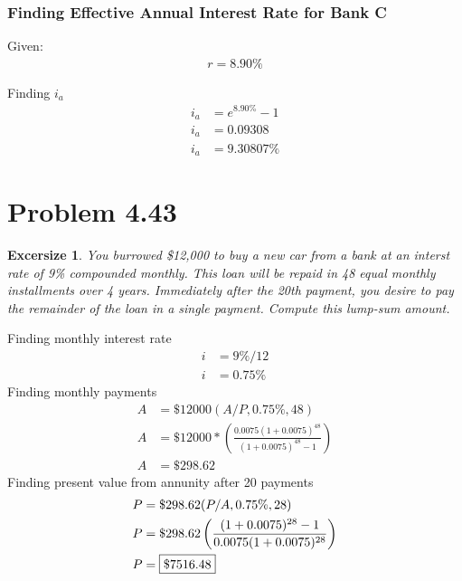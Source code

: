 \documentclass[../INDE250HW.tex]{subfiles}
\newtheorem{exrc}{Excersize}
\begin{document}
\subsubsection*{Finding Effective Annual Interest Rate for Bank C}
Given:
\begin{equation*}
    \begin{aligned}
        r = 8.90\%
    \end{aligned}
\end{equation*}

\noindent
Finding $i_a$
\begin{equation*}
    \begin{aligned}
        i_a &= e^{8.90\%} - 1 \\
        i_a &= 0.09308 \\
        i_a &= 9.30807\%
    \end{aligned}
\end{equation*}

\newpage
\section*{Problem 4.43}
\begin{exrc}
    You burrowed \$12,000 to buy a new car from a bank at an interst rate of 9\% compounded monthly. This loan will be repaid in 48 equal monthly installments over 4 years. Immediately after the 20th payment, you desire to pay the remainder of the loan in a single payment. Compute this lump-sum amount.
\end{exrc}
Finding monthly interest rate
\begin{equation*}
    \begin{aligned}
        i &= 9\%/12 \\
        i &= 0.75\%
    \end{aligned}
\end{equation*}
Finding monthly payments 
\begin{equation*}
    \begin{aligned}
        A &= \$12000(A/P, 0.75\%, 48) \\
        A &= \$12000*\left(\frac{0.0075(1+0.0075)^{48}}{(1+0.0075)^{48}-1}\right) \\
        A &= \$298.62
    \end{aligned}
\end{equation*}
Finding present value from annunity after 20 payments
\begin{equation*}
    \begin{aligned}
        P &= \$298.62(P/A,0.75\%,28) \\
        P &= \$298.62\left(\frac{(1+0.0075)^{28}-1}{0.0075(1+0.0075)^{28}}\right) \\
        P &= \framebox{$\$7516.48$}
    \end{aligned}
\end{equation*}
\end{document}
